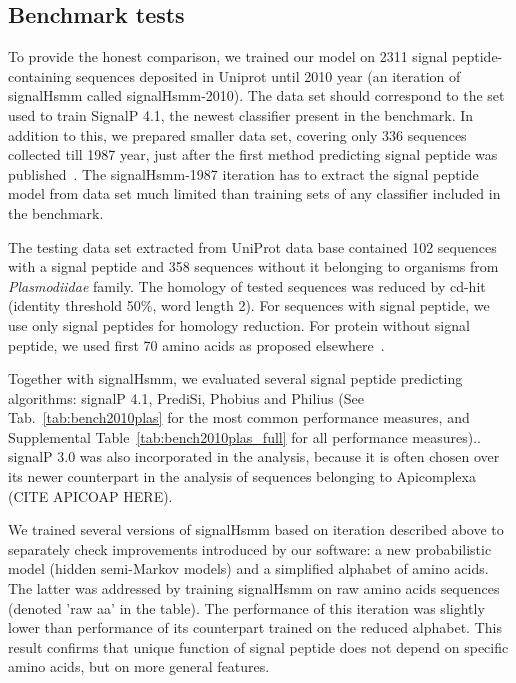 \documentclass[10pt,letterpaper]{article}
\begin{document}
\subsection*{Benchmark tests}

To provide the honest comparison, we trained our model on 2311 signal peptide-containing sequences deposited in Uniprot until 2010 year (an iteration of signalHsmm called signalHsmm-2010). The data set should correspond to the set used to train SignalP 4.1, the newest classifier present in the benchmark. In addition to this, we prepared smaller data set, covering only 336 sequences collected till 1987 year, just after the first method predicting signal peptide was published~\cite{1986vonheijnea}. The signalHsmm-1987 iteration has to extract the signal peptide model from data set much limited than training sets of any classifier included in the benchmark.

The testing data set extracted from UniProt data base contained 102 sequences with a signal peptide and 358 sequences without it belonging to organisms from \textit{Plasmodiidae} family. The homology of tested sequences was reduced by cd-hit (identity threshold 50\%, word length 2). For sequences with signal peptide, we use only signal peptides for homology reduction. For protein without signal peptide, we used first 70 amino acids as proposed elsewhere~\cite{1997nielsenidentification}.

Together with signalHsmm, we evaluated several signal peptide predicting algorithms: signalP 4.1, PrediSi, Phobius and Philius (See Tab.~\ref{tab:bench2010plas} for the most common performance measures, and Supplemental Table~\ref{tab:bench2010plas_full} for all performance measures).. signalP 3.0 was also incorporated in the analysis, because it is often chosen over its newer counterpart in the analysis of sequences belonging to Apicomplexa (CITE APICOAP HERE).

We trained several versions of signalHsmm  based on iteration described above to separately check improvements introduced by our software: a new probabilistic model (hidden semi-Markov models) and a simplified alphabet of amino acids. The latter was addressed by training signalHsmm on raw amino acids sequences (denoted 'raw aa' in the table). The performance of this iteration was slightly lower than performance of its counterpart trained on the reduced alphabet. This result confirms that unique function of signal peptide does not depend on specific amino acids, but on more general features.
\end{document}
